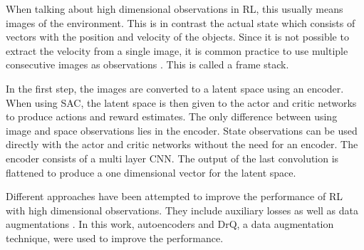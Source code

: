When talking about high dimensional observations in RL, this usually means images of the environment. This is in contrast the actual state which consists of vectors with the position and velocity of the objects. Since it is not possible to extract the velocity from a single image, it is common practice to use multiple consecutive images as observations \cite{mnihPlayingAtariDeep2013, kostrikovImageAugmentationAll2021, srinivasCURLContrastiveUnsupervised2020, yaratsImprovingSampleEfficiency2020}. This is called a frame stack.

In the first step, the images are converted to a latent space using an encoder. When using SAC, the latent space is then given to the actor and critic networks to produce actions and reward estimates. The only difference between using image and space observations lies in the encoder. State observations can be used directly with the actor and critic networks without the need for an encoder. The encoder consists of a multi layer CNN. The output of the last convolution is flattened to produce a one dimensional vector for the latent space.

Different approaches have been attempted to improve the performance of RL with high dimensional observations. They include auxiliary losses \cite{yaratsImprovingSampleEfficiency2020, stookeDecouplingRepresentationLearning, srinivasCURLContrastiveUnsupervised2020} as well as data augmentations \cite{kostrikovImageAugmentationAll2021}. In this work, autoencoders and DrQ, a data augmentation technique, were used to improve the performance.

